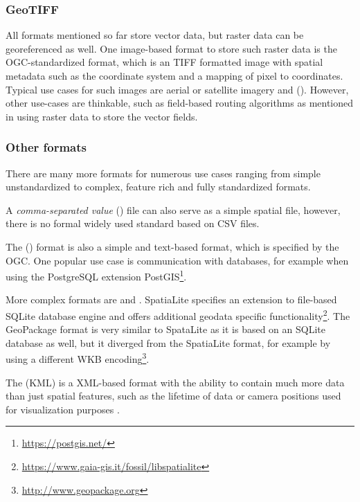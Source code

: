		\subsubsection{GeoTIFF}
		\label{subsubsec:geotiff-format}
		
			All formats mentioned so far store vector data, but raster data can be georeferenced as well.
			One image-based format to store such raster data is the OGC-standardized  format\cite{ogc-geotiff}, which is an TIFF formatted image with spatial metadata such as the coordinate system and a mapping of pixel to coordinates.
			Typical use cases for such images are aerial or satellite imagery and  ().
			However, other use-cases are thinkable, such as field-based routing algorithms as mentioned in  using raster data to store the vector fields.
		
		\subsubsection{Other formats}
		\label{subsubsec:other-formats}
		
			There are many more formats for numerous use cases ranging from simple unstandardized to complex, feature rich and fully standardized formats.
			
			A \emph{comma-separated value} () file can also serve as a simple spatial file, however, there is no formal widely used standard based on CSV files.
			
			The  () format is also a simple and text-based format, which is specified by the OGC\cite[51]{ogc-sfa}.
			One popular use case is communication with databases, for example when using the PostgreSQL extension PostGIS\footnote{\url{https://postgis.net/}}.
			
			More complex formats are  and .
			SpatiaLite specifies an extension to file-based SQLite database engine and offers additional geodata specific functionality\footnote{\url{https://www.gaia-gis.it/fossil/libspatialite}}.
			The GeoPackage format is very similar to SpataLite as it is based on an SQLite database as well, but it diverged from the SpatiaLite format, for example by using a different WKB encoding\footnote{\url{http://www.geopackage.org}}.
			
			The  (KML) is a XML-based format with the ability to contain much more data than just spatial features, such as the lifetime of data or camera positions used for visualization purposes \cite{ogc-kml-2.2}.
			
